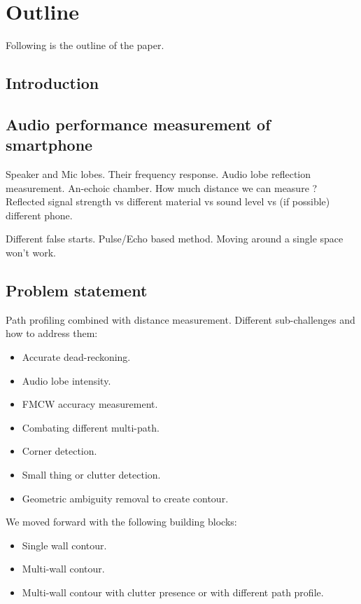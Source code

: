 \section{Outline}
Following is the outline of the paper.

 \subsection{Introduction}

\subsection{Audio performance measurement of smartphone}

Speaker and Mic lobes. Their frequency response. Audio lobe reflection measurement. An-echoic chamber. How much distance we can measure ? Reflected signal strength vs different material vs sound level vs (if possible) different phone. 

Different false starts. Pulse/Echo based method. Moving around a single space won't work.

\subsection{Problem statement}
Path profiling combined with distance measurement. Different sub-challenges and how to address them:

\begin{itemize}
\item Accurate dead-reckoning.
\item Audio lobe intensity.
\item FMCW accuracy measurement.
\item Combating different multi-path.
\item Corner detection.
\item Small thing or clutter detection.
\item Geometric ambiguity removal to create contour.
\end{itemize}

We moved forward with the following building blocks:
\begin{itemize}
\item Single wall contour.
\item Multi-wall contour.
\item Multi-wall contour with clutter presence or with different path profile.
\end{itemize}

